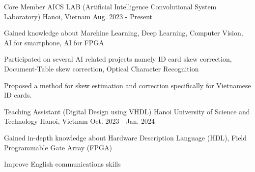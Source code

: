 
\begin{cventries}
  \cventry
  {Core Member} %
  {AICS LAB (Artificial Intelligence Convolutional System Laboratory)} %
  {Hanoi, Vietnam} %
  {Aug. 2023 - Present} %
  {
    \begin{cvitems} %
      \item {Gained knowledge about Marchine Learning, Deep Learning, Computer Vision, AI for smartphone, AI for FPGA}
      \item {Participated on several AI related projects namely ID card skew correction, Document-Table skew correction, Optical Character Recognition}
      \item Proposed a method for skew estimation and correction specifically for
      Vietnamese ID cards.
    \end{cvitems}
  }

  \cventry
  {Teaching Assistant (Digital Design using VHDL)} %
  {Hanoi University of Science and Technology} %
  {Hanoi, Vietnam} %
  {Oct. 2023 - Jan. 2024} %
  {
    \begin{cvitems} %
      \item {Gained in-depth knowledge about Hardware Description Language (HDL), Field Programmable Gate Array (FPGA)}
      \item {Improve English communications skills}
    \end{cvitems}
  }
\end{cventries}
